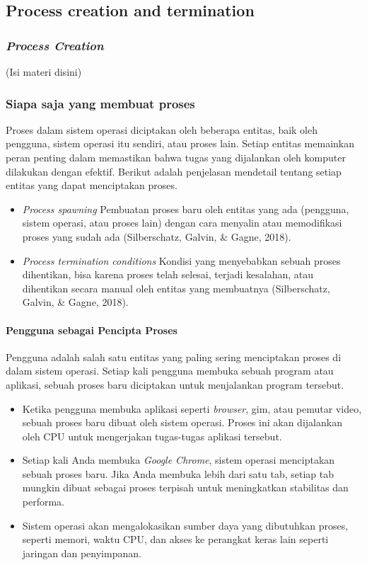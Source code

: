 \documentclass[12pt]{article}
\begin{document}
\subsection{Process creation and termination}

\subsubsection{\textit{Process Creation}}
(Isi materi disini)

\subsubsection{Siapa saja yang membuat proses}
Proses dalam sistem operasi diciptakan oleh beberapa entitas, baik oleh pengguna, sistem operasi itu sendiri, atau proses lain. Setiap entitas memainkan peran penting dalam memastikan bahwa tugas yang dijalankan oleh komputer dilakukan dengan efektif. Berikut adalah penjelasan mendetail tentang setiap entitas yang dapat menciptakan proses.
\begin{itemize}
    \item \textit{Process spawning} Pembuatan proses baru oleh entitas yang ada (pengguna, sistem operasi, atau proses lain) dengan cara menyalin atau memodifikasi proses yang sudah ada (Silberschatz, Galvin, \& Gagne, 2018).
    \item \textit{Process termination conditions} Kondisi yang menyebabkan sebuah proses dihentikan, bisa karena proses telah selesai, terjadi kesalahan, atau dihentikan secara manual oleh entitas yang membuatnya (Silberschatz, Galvin, \& Gagne, 2018).
\end{itemize}

\paragraph{Pengguna sebagai Pencipta Proses}
Pengguna adalah salah satu entitas yang paling sering menciptakan proses di dalam sistem operasi. Setiap kali pengguna membuka sebuah program atau aplikasi, sebuah proses baru diciptakan untuk menjalankan program tersebut.

\begin{itemize}
    \item  Ketika pengguna membuka aplikasi seperti \textit{browser}, gim, atau pemutar video, sebuah proses baru dibuat oleh sistem operasi. Proses ini akan dijalankan oleh CPU untuk mengerjakan tugas-tugas aplikasi tersebut.
    \item  Setiap kali Anda membuka \textit{Google Chrome}, sistem operasi menciptakan sebuah proses baru. Jika Anda membuka lebih dari satu tab, setiap tab mungkin dibuat sebagai proses terpisah untuk meningkatkan stabilitas dan performa.
    \item  Sistem operasi akan mengalokasikan sumber daya yang dibutuhkan proses, seperti memori, waktu CPU, dan akses ke perangkat keras lain seperti jaringan dan penyimpanan.
\end{itemize}
\end{document}
